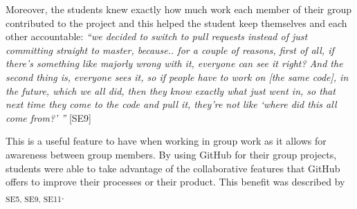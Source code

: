 
Moreover, the students knew exactly how much work each member of their group contributed to the project and this helped the student keep themselves and each other accountable: \textit{``we decided to switch to pull requests instead of just committing straight to master, because.. for a couple of reasons, first of all, if there's something like majorly wrong with it, everyone can see it right? And the second thing is, everyone sees it, so if people have to work on [the same code], in the future, which we all did, then they know exactly what just went in, so that next time they come to the code and pull it, they're not like `where did this all come from?' ''} [SE9]

This is a useful feature to have when working in group work as it allows for awareness between group members. By using GitHub for their group projects, students were able to take advantage of the collaborative features that GitHub offers to improve their processes or their product. This benefit was described by \textsubscript{SE5, SE9, SE11}. \\







